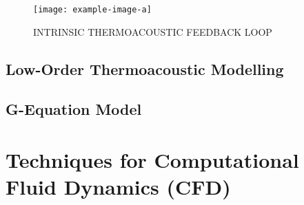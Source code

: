 \begin{figure}[t]
\centering
\texttt{[image: example-image-a]}
\caption{INTRINSIC THERMOACOUSTIC FEEDBACK LOOP}
\label{fig:ita-loop}
\end{figure}



\cite{emmert2015IntrinsicThermoacousticInstability}
\cite{silva2023IntrinsicThermoacousticInstabilities}
\cite{hoeijmakers2014IntrinsicInstabilityFlame}
\cite{hoeijmakers2016FlameDominatedThermoacoustic}
\cite{orchini2025TrackingAcousticIntrinsic}
\cite{chen2024BiglobalLinearStability}




\subsection{Low-Order Thermoacoustic Modelling}


\cite{juniper2018SensitivityNonlinearityThermoacoustic}



\subsection{G-Equation Model}





\section{Techniques for Computational Fluid Dynamics (CFD)}


\cite{orszag1970AnalyticalTheoriesTurbulence, domingo2023RecentDevelopmentsDNS, chen2011PetascaleDirectNumerical, yang2015LargeEddySimulationPresent, veynante2002TurbulentCombustionModeling, moin1998DirectNumericalSimulation, tennekes1972FirstCourseTurbulence}


